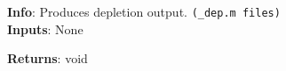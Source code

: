 \textbf{Info}: Produces depletion output. \verb|(_dep.m files)| \\

\noindent \textbf{Inputs}: None

\noindent \textbf{Returns}: void

